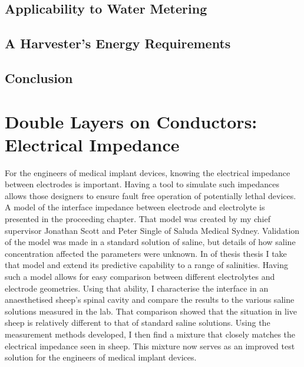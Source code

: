   \chapter{Applicability to Water Metering}
    \label{chap:part1_waterMetering}
    

  \chapter{A Harvester's Energy Requirements}
    \label{chap:part1_energyHarvestingRequirements}
    

  \chapter{Conclusion}
    \label{chap:part1_conclusion}
    



\part{Double Layers on Conductors: Electrical Impedance}
  \label{part:doubleLayersOnConductors}

  For the engineers of medical implant devices, knowing the electrical impedance between electrodes is important.
  Having a tool to simulate such impedances allows those designers to ensure fault free operation of potentially lethal devices.
  A model of the interface impedance between electrode and electrolyte is presented in the proceeding chapter.
  That model was created by my chief supervisor Jonathan Scott and Peter Single of Saluda Medical Sydney.
  Validation of the model was made in a standard solution of saline, but details of how saline concentration affected the parameters were unknown.
  In \cref{part:doubleLayersOnConductors} of thesis thesis I take that model and extend its predictive capability to a range of salinities.
  Having such a model allows for easy comparison between different electrolytes and electrode geometries.
  Using that ability, I characterise the interface in an anaesthetised sheep's spinal cavity and compare the results to the various saline solutions measured in the lab.
  That comparison showed that the situation in live sheep is relatively different to that of standard saline solutions.
  Using the measurement methods developed, I then find a mixture that closely matches the electrical impedance seen in sheep.
  This mixture now serves as an improved test solution for the engineers of medical implant devices.



